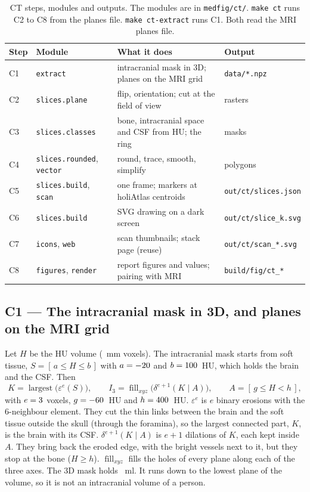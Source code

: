 \documentclass[10pt,a4paper]{article}
\newcommand{\code}[1]{\texttt{#1}}
\begin{document}
\begin{table}[H]\centering\small
\begin{tabularx}{\linewidth}{@{}l l >{\raggedright\arraybackslash}X >{\raggedright\arraybackslash}p{3.7cm}@{}}\toprule
Step & Module & What it does & Output\\\midrule
C1 & \code{extract} & intracranial mask in 3D; planes on the MRI grid & \code{data/*.npz}\\
C2 & \code{slices.plane} & flip, orientation; cut at the field of view & rasters\\
C3 & \code{slices.classes} & bone, intracranial space and CSF from HU; the ring & masks\\
C4 & \code{slices.rounded}, \code{vector} & round, trace, smooth, simplify & polygons\\
C5 & \code{slices.build}, \code{scan} & one frame; markers at holiAtlas centroids & \code{out/ct/slices.json}\\
C6 & \code{slices.build} & SVG drawing on a dark screen & \code{out/ct/slice\_k.svg}\\
C7 & \code{icons}, \code{web} & scan thumbnails; stack page (reuse) & \code{out/ct/scan\_*.svg}\\
C8 & \code{figures}, \code{render} & report figures and values; pairing with MRI & \code{build/fig/ct\_*}\\\bottomrule
\end{tabularx}
\caption{CT steps, modules and outputs. The modules are in \code{medfig/ct/}. \code{make ct} runs C2 to C8 from the planes file.
\code{make ct-extract} runs C1. Both read the MRI planes file.}\label{t:csteps}
\end{table}

\subsection{C1 --- The intracranial mask in 3D, and planes on the MRI grid}\label{s:c1}
Let $H$ be the HU volume (\ctVolVs~mm voxels). The intracranial mask starts from soft tissue, $S = [\,a \le H \le b\,]$ with
$a=-20$ and $b=100$~HU, which holds the brain and the CSF. Then
\begin{equation}
K = \operatorname{largest}\big(\varepsilon^{e}(S)\big),\qquad
I_3 = \operatorname{fill}_{xyz}\big(\delta^{e+1}(K \mid A)\big),\qquad A = [\,g \le H < h\,],
\end{equation}
with $e=3$ voxels, $g=-60$~HU and $h=400$~HU. $\varepsilon^{e}$ is $e$ binary erosions with the
6-neighbour element. They cut the thin links between the brain and the soft tissue outside the skull (through the foramina),
so the largest connected part, $K$, is the brain with its CSF. $\delta^{e+1}(K\mid A)$ is $e+1$ dilations of $K$, each kept
inside $A$. They bring back the eroded edge, with the bright vessels next to it, but they stop at the bone ($H\ge h$). $\operatorname{fill}_{xyz}$ fills the holes of every plane along each of the three axes. The 3D mask holds
\ctIcvMl~ml. It runs down to the lowest plane of the volume, so it is not an intracranial volume of a person.
\end{document}
